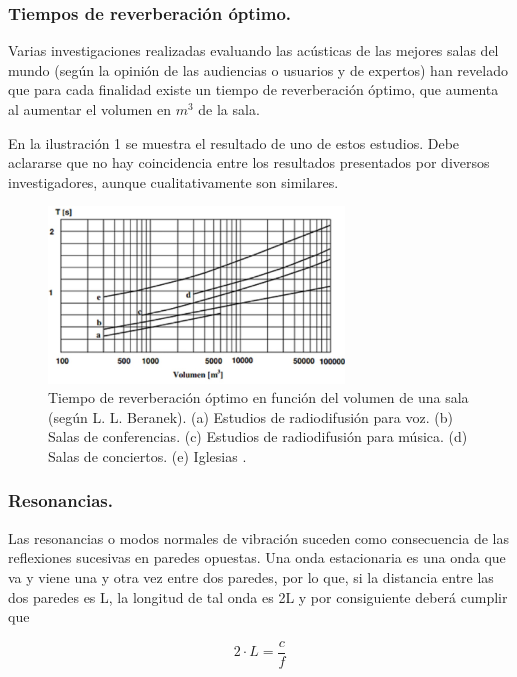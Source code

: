 \subsubsection{Tiempos de reverberación óptimo.} Varias investigaciones realizadas evaluando las acústicas de las mejores salas del mundo (según la opinión de las audiencias o usuarios y de expertos) han revelado que para cada finalidad existe un tiempo de reverberación óptimo, que aumenta al aumentar el volumen en $m^3$ de la sala.

En la ilustración 1 se muestra el resultado de uno de estos estudios. Debe aclararse que no hay coincidencia entre los resultados presentados por diversos investigadores, aunque cualitativamente son similares.

\begin{figure}[!htb]
    \centering
    \includegraphics[width=0.7\textwidth]{imagenes/1.jpg}
    \caption{\footnotesize Tiempo de reverberación óptimo en función del volumen de una sala (según L. L. Beranek). (a) Estudios de radiodifusión para voz. (b) Salas de conferencias. (c) Estudios de radiodifusión para música. (d) Salas de conciertos. (e) Iglesias \cite{Miyara2004}.}
    \label{fig:TiempoRevOpt}
\end{figure}
\FloatBarrier

\subsubsection{Resonancias.} Las resonancias o modos normales de vibración suceden como consecuencia de las reflexiones sucesivas en paredes opuestas. Una onda estacionaria es una onda que va y viene una y otra vez entre dos paredes, por lo que, si la distancia entre las dos paredes es L, la longitud de tal onda es 2L y por consiguiente deberá cumplir que

\begin{equation}
2\cdot L = \frac{c}{f}
\end{equation}

